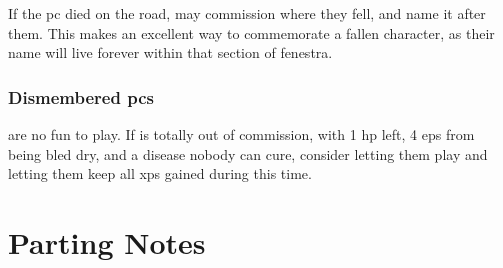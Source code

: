 \begin{multicols}{2}
If the \gls{pc} died on the road,  may commission  where they fell, and name it after them.
This makes an excellent way to commemorate a fallen character, as their name will live forever within that section of \gls{fenestra}.

\subsubsection{Dismembered \Glspl{pc}}
are no fun to play.
If  is totally out of commission, with 1 \gls{hp} left, 4 \glspl{ep} from being bled dry, and a disease nobody can cure, consider letting them play  and letting them keep all \glspl{xp} gained during this time.

\end{multicols}

\section{Parting Notes}

